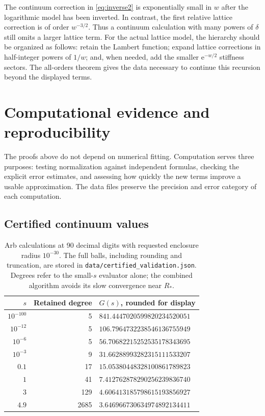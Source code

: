 \documentclass[11pt,a4paper]{article}
\numberwithin{equation}{section}
\theoremstyle{definition}
\newcommand{\e}{\mathrm e}
\begin{document}
The continuum correction in \eqref{eq:inverse2} is exponentially small
in $w$ after the logarithmic model has been inverted. In contrast, the
first relative lattice correction is of order $w^{-3/2}$. Thus a
continuum calculation with many powers of $\delta$ still omits a larger
lattice term. For the actual lattice model, the hierarchy should be
organized as follows: retain the Lambert function; expand lattice
corrections in half-integer powers of $1/w$; and, when needed, add the
smaller $\e^{-w/2}$ stiffness sectors. The all-orders theorem gives the
data necessary to continue this recursion beyond the displayed terms.

\section{Computational evidence and reproducibility}
\label{sec:numerics}

The proofs above do not depend on numerical fitting. Computation serves
three purposes: testing normalization against independent formulas,
checking the explicit error estimates, and assessing how quickly the
new terms improve a usable approximation. The data files preserve the
precision and error category of each computation.

\subsection{Certified continuum values}

\begin{table}[ht]
\centering\small
\begin{tabular}{r r l}
\toprule
$s$ & Retained degree & $G(s)$, rounded for display\\
\midrule
$10^{-100}$ & 5 & $841.4447020599820234520051$\\
$10^{-12}$  & 5 & $106.7964732238546136755949$\\
$10^{-6}$   & 5 & $56.70682215252535178343695$\\
$10^{-3}$   & 9 & $31.66288993282315111533207$\\
$0.1$      & 17 & $15.05380448328100861789823$\\
$1$        & 41 & $7.412762878290256239836740$\\
$3$        & 129 & $4.606413185798615193856927$\\
$4.9$      & 2685 & $3.646966730634974892134411$\\
\bottomrule
\end{tabular}
\caption{Arb calculations at 90 decimal digits with requested enclosure
radius $10^{-30}$. The full balls, including rounding and truncation,
are stored in \texttt{data/certified\_validation.json}. Degrees refer
to the small-$s$ evaluator alone; the combined algorithm avoids its
slow convergence near $R_*$.}
\label{tab:certified}
\end{table}
\end{document}
